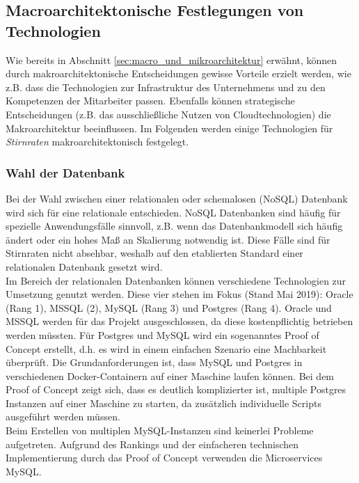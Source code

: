 {\subsection{Macroarchitektonische Festlegungen von Technologien}
Wie bereits in Abschnitt \ref{sec:macro_und_mikroarchitektur} erwähnt, können durch makroarchitektonische Entscheidungen gewisse Vorteile erzielt werden, wie z.B. dass die Technologien zur Infrastruktur des Unternehmens und zu den Kompetenzen der Mitarbeiter passen. Ebenfalls können strategische Entscheidungen (z.B. das ausschließliche Nutzen von Cloudtechnologien) die Makroarchitektur beeinflussen. Im Folgenden werden einige Technologien für \textit{Stirnraten} makroarchitektonisch festgelegt. 

\subsubsection{Wahl der Datenbank}
Bei der Wahl zwischen einer relationalen oder schemalosen (NoSQL) Datenbank wird sich für eine relationale entschieden. NoSQL Datenbanken sind häufig für spezielle Anwendungsfälle sinnvoll, z.B. wenn das Datenbankmodell sich häufig ändert oder ein hohes Maß an Skalierung notwendig ist. Diese Fälle sind für Stirnraten nicht absehbar, weshalb auf den etablierten Standard einer relationalen Datenbank gesetzt wird.\cite{kloeckner2015nosql_vs_relationale_datenbank}\\

Im Bereich der relationalen Datenbanken können verschiedene Technologien zur Umsetzung genutzt werden. Diese vier stehen im Fokus (Stand Mai 2019): Oracle (Rang 1), MSSQL (2), MySQL (Rang 3) und Postgres (Rang 4).\cite{dbengines2019ranking}  Oracle und MSSQL werden für das Projekt ausgeschlossen, da diese kostenpflichtig betrieben werden müssten. Für Postgres und MySQL wird ein sogenanntes Proof of Concept erstellt, d.h. es wird in einem einfachen Szenario eine Machbarkeit überprüft. Die Grundanforderungen ist, dass MySQL und Postgres in verschiedenen Docker-Containern auf einer Maschine laufen können. Bei dem Proof of Concept zeigt sich, dass es deutlich komplizierter ist, multiple Postgres Instanzen auf einer Maschine zu starten, da zusätzlich individuelle Scripts ausgeführt werden müssen.\cite{postgres2016}\\

Beim Erstellen von multiplen MySQL-Instanzen sind keinerlei Probleme aufgetreten. Aufgrund des Rankings und der einfacheren technischen Implementierung durch das Proof of Concept verwenden die Microservices MySQL.

}
